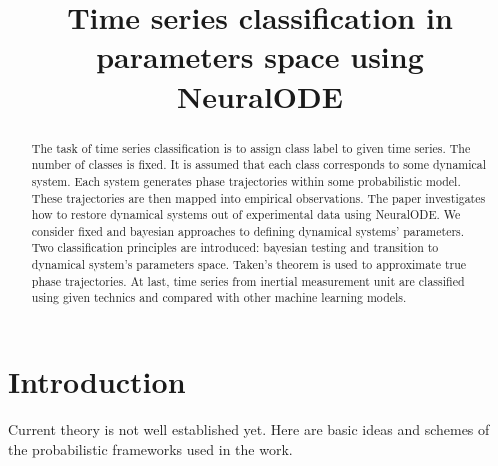 \documentclass[referee, pdflatex, sn-mathphys-num]{sn-jnl}
\theoremstyle{definition}
\theoremstyle{plain}
\begin{document}
	
	\title{Time series classification in parameters space using NeuralODE}
	
	\author*[1]{ }
	\author*[2]{ }
	
	
	
	\maketitle
	
	\begin{abstract}
		
		The task of time series classification is to assign class label to given time series. The number of classes is fixed. It is assumed that each class corresponds to some dynamical system. Each system generates phase trajectories within some probabilistic model. These trajectories are then mapped into empirical observations. The paper investigates how to restore dynamical systems out of experimental data using NeuralODE. We consider fixed and bayesian approaches to defining dynamical systems' parameters. Two classification principles are introduced: bayesian testing and transition to dynamical system's parameters space. Taken's theorem is used to approximate true phase trajectories. At last, time series from inertial measurement unit are classified using given technics and compared with other machine learning models.
		
	\end{abstract}
	
	\section{Introduction}\label{Intro}
	
	Current theory is not well established yet. Here are basic ideas and schemes of the probabilistic frameworks used in the work.
	
\end{document}

